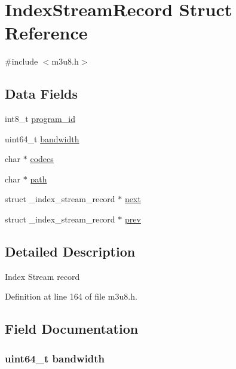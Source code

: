 \hypertarget{struct_index_stream_record}{\section{\-Index\-Stream\-Record \-Struct \-Reference}
\label{struct_index_stream_record}
}


{\ttfamily \#include $<$m3u8.\-h$>$}

\subsection*{\-Data \-Fields}
\begin{DoxyCompactItemize}
\item 
int8\-\_\-t \hyperlink{struct_index_stream_record_a3a9354735383f94a70b6bf5df89ce6a7}{program\-\_\-id}
\item 
uint64\-\_\-t \hyperlink{struct_index_stream_record_a034947e9cfc3ee9d5e27c3753bf3bbdd}{bandwidth}
\item 
char $\ast$ \hyperlink{struct_index_stream_record_a059ea02ff9dcb573204e15648bf712bd}{codecs}
\item 
char $\ast$ \hyperlink{struct_index_stream_record_a44196e6a5696d10442c29e639437196e}{path}
\item 
struct \-\_\-index\-\_\-stream\-\_\-record $\ast$ \hyperlink{struct_index_stream_record_aad0507926208e410a30e1bf90569e601}{next}
\item 
struct \-\_\-index\-\_\-stream\-\_\-record $\ast$ \hyperlink{struct_index_stream_record_a8bd73ff6ff04390035db860b0541b819}{prev}
\end{DoxyCompactItemize}


\subsection{\-Detailed \-Description}
\-Index \-Stream record 

\-Definition at line 164 of file m3u8.\-h.



\subsection{\-Field \-Documentation}
\hypertarget{struct_index_stream_record_a034947e9cfc3ee9d5e27c3753bf3bbdd}{
\subsubsection[{bandwidth}]{\setlength{\rightskip}{0pt plus 5cm}uint64\-\_\-t {\bf bandwidth}}}\label{struct_index_stream_record_a034947e9cfc3ee9d5e27c3753bf3bbdd}


